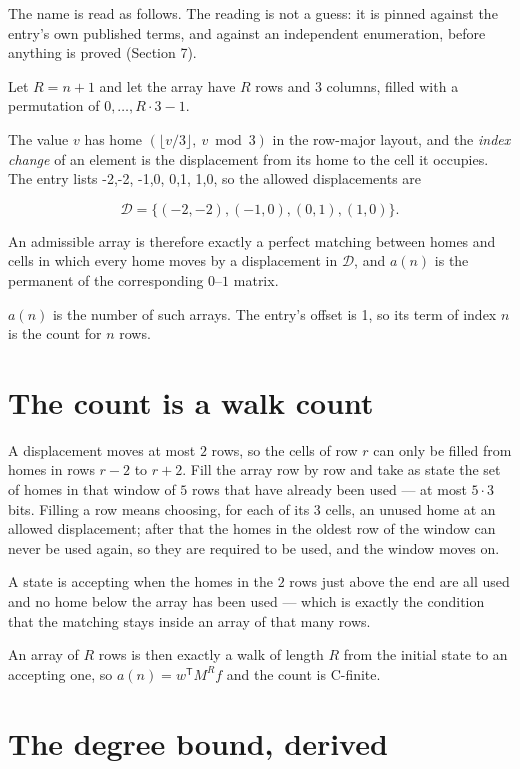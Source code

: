 \documentclass[11pt]{article}
\theoremstyle{definition}
\begin{document}
The name is read as follows. The reading is not a guess: it is pinned against the entry's own published terms, and against an independent enumeration, before anything is proved (Section 7).

Let $R = n + 1$ and let the array have $R$ rows and $3$ columns, filled with a permutation of $0,\dots,R\cdot3-1$.

The value $v$ has home $(\lfloor v/3\rfloor,\ v \bmod 3)$ in the row-major layout, and the {\itshape index change} of an element is the displacement from its home to the cell it occupies. The entry lists -2,-2, -1,0, 0,1, 1,0, so the allowed displacements are

\[\mathcal{D} = \{(-2,-2), (-1,0), (0,1), (1,0)\}.\]

An admissible array is therefore exactly a perfect matching between homes and cells in which every home moves by a displacement in $\mathcal{D}$, and $a(n)$ is the permanent of the corresponding $0$--$1$ matrix.

$a(n)$ is the number of such arrays. The entry's offset is 1, so its term of index $n$ is the count for $n$ rows.

\section{The count is a walk count}

A displacement moves at most $2$ rows, so the cells of row $r$ can only be filled from homes in rows $r-2$ to $r+2$. Fill the array row by row and take as state the set of homes in that window of $5$ rows that have already been used --- at most $5\cdot3$ bits. Filling a row means choosing, for each of its $3$ cells, an unused home at an allowed displacement; after that the homes in the oldest row of the window can never be used again, so they are required to be used, and the window moves on.

A state is accepting when the homes in the $2$ rows just above the end are all used and no home below the array has been used --- which is exactly the condition that the matching stays inside an array of that many rows.

An array of $R$ rows is then exactly a walk of length $R$ from the initial state to an accepting one, so $a(n) = w^{\mathsf T}M^{R}f$ and the count is C-finite.

\section{The degree bound, derived}
\end{document}
